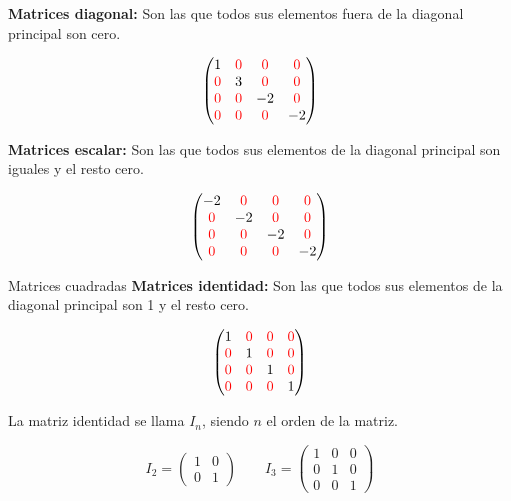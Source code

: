 \documentclass[9pt]{beamer}
\begin{document}
\begin{frame}


 \textbf{Matrices diagonal:} Son las que todos sus elementos fuera de la diagonal principal son cero.

\[
  \begin{pmatrix} 1 & \color{red}0 & \color{red}0 & \color{red}0  \\
  \color{red}0 & 3  & \color{red}0 & \color{red}0  \\
  \color{red}0 & \color{red}0 & -2 & \color{red}0 \\
 \color{red}0 & \color{red}0  & \color{red}0 & -2  \\ 
\end{pmatrix}
\] 

\pause
 \textbf{Matrices escalar:} Son las que todos sus elementos  de la diagonal principal son iguales y el resto cero.

\[
  \begin{pmatrix} -2 & \color{red}0 & \color{red}0 & \color{red}0  \\
  \color{red}0 & -2  & \color{red}0 & \color{red}0  \\
  \color{red}0 & \color{red}0 & -2 & \color{red}0 \\
 \color{red}0 & \color{red}0  & \color{red}0 & -2  \\ 
\end{pmatrix}
\] 


\end{frame}

\begin{frame}{Matrices cuadradas}
\textbf{Matrices identidad:} Son las que todos sus elementos  de la diagonal principal son 1 y el resto cero.

\[
  \begin{pmatrix} 1 & \color{red}0 & \color{red}0 & \color{red}0  \\
  \color{red}0 & 1  & \color{red}0 & \color{red}0  \\
  \color{red}0 & \color{red}0 & 1 & \color{red}0 \\
 \color{red}0 & \color{red}0  & \color{red}0 & 1  \\ 
\end{pmatrix}
\] 

\pause
La matriz identidad se llama $I_n$, siendo $n$ el orden de la matriz.

\[ I_2= \begin{pmatrix}
1 & 0 \\ 
0 & 1 
\end{pmatrix} \qquad 
I_3=\begin{pmatrix} 
1 & 0 & 0 \\
0 & 1 & 0 \\
0 & 0 & 1 

\end{pmatrix}
\]
\end{frame}
\end{document}
